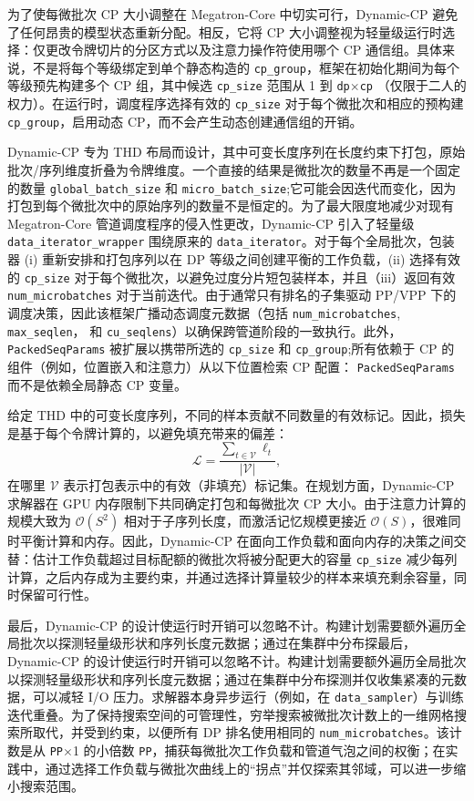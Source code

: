 \documentclass[10pt,logo,copyright]{nvidiatechreport_zh}
\begin{document}
为了使每微批次 CP 大小调整在 Megatron-Core 中切实可行，Dynamic-CP 避免了任何昂贵的模型状态重新分配。相反，它将 CP 大小调整视为轻量级运行时选择：仅更改令牌切片的分区方式以及注意力操作符使用哪个 CP 通信组。具体来说，不是将每个等级绑定到单个静态构造的 \texttt{cp\_group}，框架在初始化期间为每个等级预先构建多个 CP 组，其中候选 \texttt{cp\_size} 范围从 1 到 \texttt{dp}$\times$\texttt{cp} （仅限于二人的权力）。在运行时，调度程序选择有效的 \texttt{cp\_size} 对于每个微批次和相应的预构建 \texttt{cp\_group}，启用动态 CP，而不会产生动态创建通信组的开销。

Dynamic-CP 专为 THD 布局而设计，其中可变长度序列在长度约束下打包，原始批次/序列维度折叠为令牌维度。一个直接的结果是微批次的数量不再是一个固定的数量 \texttt{global\_batch\_size} 和 \texttt{micro\_batch\_size};它可能会因迭代而变化，因为打包到每个微批次中的原始序列的数量不是恒定的。为了最大限度地减少对现有 Megatron-Core 管道调度程序的侵入性更改，Dynamic-CP 引入了轻量级 \texttt{data\_iterator\_wrapper} 围绕原来的 \texttt{data\_iterator}。对于每个全局批次，包装器 (i) 重新安排和打包序列以在 DP 等级之间创建平衡的工作负载，(ii) 选择有效的 \texttt{cp\_size} 对于每个微批次，以避免过度分片短包装样本，并且（iii）返回有效 \texttt{num\_microbatches} 对于当前迭代。由于通常只有排名的子集驱动 PP/VPP 下的调度决策，因此该框架广播动态调度元数据（包括 \texttt{num\_microbatches}, \texttt{max\_seqlen}， 和 \texttt{cu\_seqlens}）以确保跨管道阶段的一致执行。此外， \texttt{PackedSeqParams} 被扩展以携带所选的 \texttt{cp\_size} 和 \texttt{cp\_group};所有依赖于 CP 的组件（例如，位置嵌入和注意力）从以下位置检索 CP 配置： \texttt{PackedSeqParams} 而不是依赖全局静态 CP 变量。

给定 THD 中的可变长度序列，不同的样本贡献不同数量的有效标记。因此，损失是基于每个令牌计算的，以避免填充带来的偏差：
\begin{equation}
\mathcal{L} = \frac{\sum_{t\in \mathcal{V}} \ell_t}{|\mathcal{V}|},
\end{equation}
在哪里 $\mathcal{V}$ 表示打包表示中的有效（非填充）标记集。在规划方面，Dynamic-CP 求解器在 GPU 内存限制下共同确定打包和每微批次 CP 大小。由于注意力计算的规模大致为 $\mathcal{O}(S^2)$ 相对于子序列长度，而激活记忆规模更接近 $\mathcal{O}(S)$，很难同时平衡计算和内存。因此，Dynamic-CP 在面向工作负载和面向内存的决策之间交替：估计工作负载超过目标配额的微批次将被分配更大的容量 \texttt{cp\_size} 减少每列计算，之后内存成为主要约束，并通过选择计算量较少的样本来填充剩余容量，同时保留可行性。

最后，Dynamic-CP 的设计使运行时开销可以忽略不计。构建计划需要额外遍历全局批次以探测轻量级形状和序列长度元数据；通过在集群中分布探最后，Dynamic-CP 的设计使运行时开销可以忽略不计。构建计划需要额外遍历全局批次以探测轻量级形状和序列长度元数据；通过在集群中分布探测并仅收集紧凑的元数据，可以减轻 I/O 压力。求解器本身异步运行（例如，在 \texttt{data\_sampler}）与训练迭代重叠。为了保持搜索空间的可管理性，穷举搜索被微批次计数上的一维网格搜索所取代，并受到约束，以便所有 DP 排名使用相同的 \texttt{num\_microbatches}。该计数是从 \texttt{PP}$\times$1 的小倍数 \texttt{PP}，捕获每微批次工作负载和管道气泡之间的权衡；在实践中，通过选择工作负载与微批次曲线上的“拐点”并仅探索其邻域，可以进一步缩小搜索范围。
\end{document}
